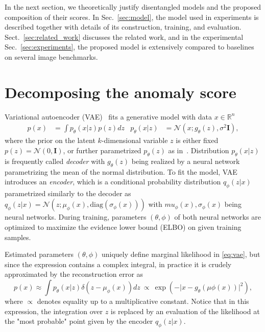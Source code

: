 In the next section, we theoretically justify disentangled models and the proposed composition of their scores. In Sec.~\ref{sec:model}, the model used in experiments is described together with details of its construction, training, and evaluation. Sect.~\ref{sec:related_work} discusses the related work, and in the experimental Sec.~\ref{sec:experiments}, the proposed model is extensively compared to baselines on several image benchmarks.

\section{Decomposing the anomaly score} 
\label{sec:theory}
Variational autoencoder (VAE)~\cite{kingma2013vae} fits a generative model with data $x \in \mathbb{R}^n$
\begin{align}
p(x) & = \int p_{\theta}(x \vert z)p(z)dz & p_{\theta}(x\vert z) & =\mathcal{N}(x;g_{\theta}(z),\sigma^{2} \mathbf{I}),\label{eq:vae}
\end{align}
where the prior on the latent $k$-dimensional variable $z$ is either fixed $p(z)=\mathcal{N}(0,\mathbf{I})$, or further parametrized $p_{\theta}(z)$ as in~\cite{tomczak2017vae}. Distribution $p_{\theta}(x\vert z)$ is frequently called \emph{decoder} with $g_{\theta}(z)$ being realized by a neural network parametrizing the mean of the normal distribution. To fit the model, VAE introduces an \emph{encoder}, which is a conditional probability distribution $q_{\phi}(z\vert x)$ parametrized similarly to the decoder as $q_{\phi}(z\vert x)=\mathcal{N}(z;\mu_{\phi}(x),\text{diag}(\sigma_{\phi}(x)))$ with $mu_{\phi}(x), \sigma_{\phi}(x)$ being neural networks. During training, parameters $(\theta,\phi)$ of both neural networks are optimized to maximize the evidence lower bound (ELBO) on given training samples.

Estimated parameters $(\theta,\phi)$ uniquely define marginal likelihood in \eqref{eq:vae}, but since the expression contains a complex integral, in practice it is crudely approximated by the reconstruction error as 
\begin{equation}
p(x)\approx\int p_{\theta}(x\vert z)\delta(z-\mu_{\phi}(x))dz\ \propto\ \exp\left(-\vert x-g_{\theta}(\mu{\phi}(x))\vert ^{2}\right), \label{eq:px-vita}
\end{equation}
where $\propto$ denotes equality up to a multiplicative constant. Notice that in this expression, the integration over $z$ is replaced by an evaluation of the likelihood at the "most probable" point given by the encoder $q_{\phi}(z\vert x).$

